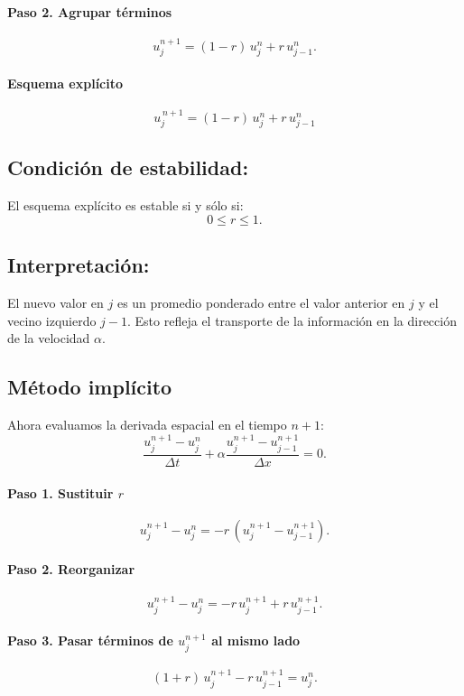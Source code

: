 \documentclass[12pt,a4paper]{article}
\begin{document}
\paragraph{Paso 2. Agrupar términos}  
\[
u_j^{n+1} = (1-r)\,u_j^n + r\,u_{j-1}^n.
\]

\paragraph{Esquema explícito}  
\[
\boxed{u_j^{\,n+1} = (1-r)\,u_j^n + r\,u_{j-1}^n}
\]

\subsection*{Condición de estabilidad:}
El esquema explícito es estable si y sólo si:
\[
0 \leq r \leq 1.
\]

\subsection*{Interpretación:}
El nuevo valor en $j$ es un promedio ponderado entre el valor anterior en $j$ y el vecino izquierdo $j-1$.  
Esto refleja el transporte de la información en la dirección de la velocidad $\alpha$.

\subsection{Método implícito}

Ahora evaluamos la derivada espacial en el tiempo $n+1$:
\[
\frac{u_j^{n+1}-u_j^n}{\Delta t} + \alpha \frac{u_j^{n+1} - u_{j-1}^{n+1}}{\Delta x} = 0.
\]

\paragraph{Paso 1. Sustituir $r$}  
\[
u_j^{n+1} - u_j^n = -r\,(u_j^{n+1} - u_{j-1}^{n+1}).
\]

\paragraph{Paso 2. Reorganizar}  
\[
u_j^{n+1} - u_j^n = -r\,u_j^{n+1} + r\,u_{j-1}^{n+1}.
\]

\paragraph{Paso 3. Pasar términos de $u_j^{n+1}$ al mismo lado}  
\[
(1+r)\,u_j^{n+1} - r\,u_{j-1}^{n+1} = u_j^n.
\]
\end{document}
